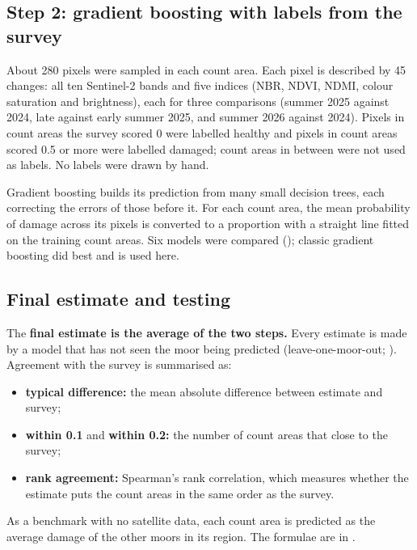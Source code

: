 \documentclass[11pt,a4paper]{article}
\begin{document}
\subsection{Step 2: gradient boosting with labels from the survey}

About 280 pixels were sampled in each count area. Each pixel is described by 45 changes: all ten Sentinel-2 bands and five indices (NBR, NDVI, NDMI, colour saturation and brightness), each for three comparisons (summer 2025 against 2024, late against early summer 2025, and summer 2026 against 2024). Pixels in count areas the survey scored 0 were labelled healthy and pixels in count areas scored 0.5 or more were labelled damaged; count areas in between were not used as labels. No labels were drawn by hand.

Gradient boosting \citep{friedman2001} builds its prediction from many small decision trees, each correcting the errors of those before it. For each count area, the mean probability of damage across its pixels is converted to a proportion with a straight line fitted on the training count areas. Six models were compared (); classic gradient boosting did best and is used here.

\subsection{Final estimate and testing}

The \textbf{final estimate is the average of the two steps.} Every estimate is made by a model that has not seen the moor being predicted (leave-one-moor-out; \citealp{roberts2017}). Agreement with the survey is summarised as:
\begin{itemize}
\item \textbf{typical difference:} the mean absolute difference between estimate and survey;
\item \textbf{within 0.1} and \textbf{within 0.2:} the number of count areas that close to the survey;
\item \textbf{rank agreement:} Spearman's rank correlation, which measures whether the estimate puts the count areas in the same order as the survey.
\end{itemize}
As a benchmark with no satellite data, each count area is predicted as the average damage of the other moors in its region. The formulae are in .

\FloatBarrier
\end{document}
